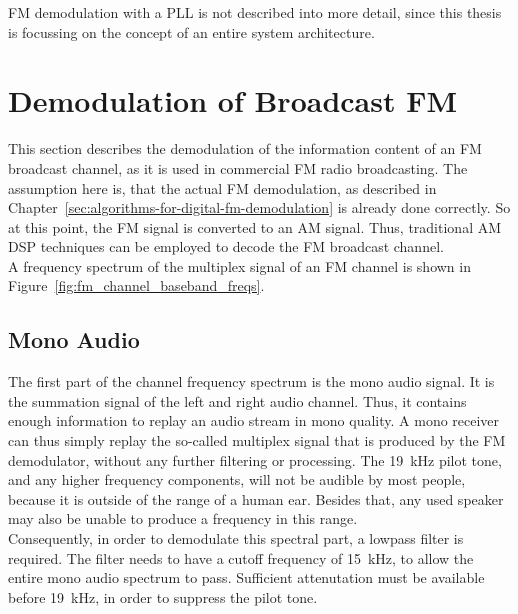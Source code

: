 FM demodulation with a PLL is not described into more detail, since this thesis is focussing on the concept of an entire system architecture.

\section{Demodulation of Broadcast FM}
\label{sec:demodulation-of-broadcast-fm}

This section describes the demodulation of the information content of an FM broadcast channel, as it is used in commercial FM radio broadcasting.
The assumption here is, that the actual FM demodulation, as described in Chapter~\ref{sec:algorithms-for-digital-fm-demodulation} is already done correctly.
So at this point, the FM signal is converted to an AM signal.
Thus, traditional AM DSP techniques can be employed to decode the FM broadcast channel.\\

\noindent
A frequency spectrum of the multiplex signal of an FM channel is shown in Figure~\ref{fig:fm_channel_baseband_freqs}.

\subsection{Mono Audio}
\label{subsec:demod_mono}

The first part of the channel frequency spectrum is the mono audio signal.
It is the summation signal of the left and right audio channel.
Thus, it contains enough information to replay an audio stream in mono quality.
A mono receiver can thus simply replay the so-called multiplex signal that is produced by the FM demodulator, without any further filtering or processing.
The 19~kHz pilot tone, and any higher frequency components, will not be audible by most people, because it is outside of the range of a human ear.
Besides that, any used speaker may also be unable to produce a frequency in this range.\\

Consequently, in order to demodulate this spectral part, a lowpass filter is required.
The filter needs to have a cutoff frequency of 15~kHz, to allow the entire mono audio spectrum to pass.
Sufficient attenutation must be available before 19~kHz, in order to suppress the pilot tone.

